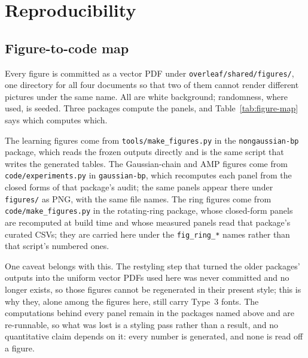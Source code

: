 \chapter{Reproducibility}\label{app:repro}

\setlength{\emergencystretch}{2em}

\section{Figure-to-code map}

Every figure is committed as a vector PDF under
\texttt{overleaf/shared/figures/}, one directory for all four documents so that
two of them cannot render different pictures under the same name. All are white
background; randomness, where used, is seeded. Three packages compute the
panels, and Table~\ref{tab:figure-map} says which computes which.

The learning figures come from \texttt{tools/make\_figures.py} in the
\texttt{nongaussian-bp} package, which reads the frozen outputs directly and is
the same script that writes the generated tables. The Gaussian-chain and AMP
figures come from \texttt{code/experiments.py} in \texttt{gaussian-bp}, which
recomputes each panel from the closed forms of that package's audit; the same
panels appear there under \texttt{figures/} as PNG, with the same file names.
The ring figures come from \texttt{code/make\_figures.py} in the rotating-ring
package, whose closed-form panels are recomputed at build time and whose
measured panels read that package's curated CSVs; they are carried here under
the \texttt{fig\_ring\_*} names rather than that script's numbered ones.

One caveat belongs with this. The restyling step that turned the older
packages' outputs into the uniform vector PDFs used here was never committed and
no longer exists, so those figures cannot be regenerated in their present style;
this is why they, alone among the figures here, still carry Type~3 fonts. The
computations behind every panel remain in the packages named above and are
re-runnable, so what was lost is a styling pass rather than a result, and no
quantitative claim depends on it: every number is generated, and none is read
off a figure.

